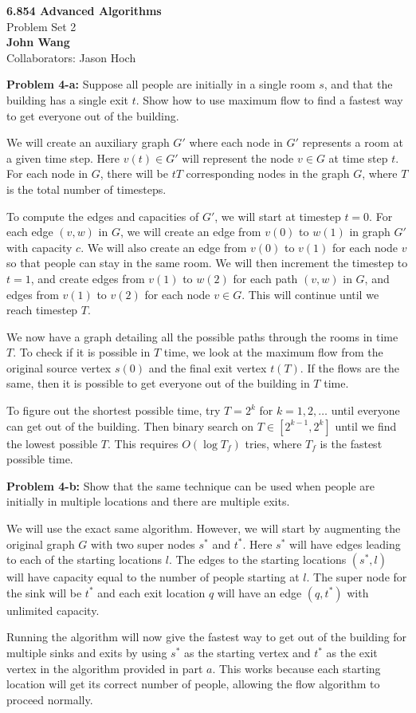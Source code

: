 \documentclass[psamsfonts]{amsart}
\newenvironment{sol}{\vspace{0.25cm}{\large \bfseries Solution:}}{\qedsymbol}
\newenvironment{prob}[1]{\begin{framed}{\large \bfseries Problem #1:}}{\end{framed}}
\newcommand{\makenewtitle}{
    \begin{center}
    {\huge \bfseries 6.854 Advanced Algorithms} \\
    Problem Set 2\\
    \vspace{0.25cm}
    {\bfseries John Wang} \\
    Collaborators: Jason Hoch
    \end{center}
    \vspace{0.5cm}
}
\begin{document}
\newpage
\makenewtitle

\begin{prob}{4-a}
Suppose all people are initially in a single room $s$, and that the building has a single exit $t$. Show how to use maximum flow to find a fastest way to get everyone out of the building.
\end{prob}
\begin{sol}
We will create an auxiliary graph $G'$ where each node in $G'$ represents a room at a given time step. Here $v(t) \in G'$ will represent the node $v \in G$ at time step $t$. For each node in $G$, there will be $tT$ corresponding nodes in the graph $G$, where $T$ is the total number of timesteps.

To compute the edges and capacities of $G'$, we will start at timestep $t=0$. For each edge $(v,w)$ in $G$, we will create an edge from $v(0)$ to $w(1)$ in graph $G'$ with capacity $c$. We will also create an edge from $v(0)$ to $v(1)$ for each node $v$ so that people can stay in the same room. We will then increment the timestep to $t=1$, and create edges from $v(1)$ to $w(2)$ for each path $(v,w)$ in $G$, and edges from $v(1)$ to $v(2)$ for each node $v \in G$. This will continue until we reach timestep $T$. 

We now have a graph detailing all the possible paths through the rooms in time $T$. To check if it is possible in $T$ time, we look at the maximum flow from the original source vertex $s(0)$ and the final exit vertex $t(T)$. If the flows are the same, then it is possible to get everyone out of the building in $T$ time. 

To figure out the shortest possible time, try $T=2^{k}$ for $k=1,2,\ldots$ until everyone can get out of the building. Then binary search on $T \in [2^{k-1}, 2^{k}]$ until we find the lowest possible $T$. This requires $O(\log T_{f})$ tries, where $T_f$ is the fastest possible time.
\end{sol}

\begin{prob}{4-b}
Show that the same technique can be used when people are initially in multiple locations and there are multiple exits.
\end{prob}
\begin{sol}
We will use the exact same algorithm. However, we will start by augmenting the original graph $G$ with two super nodes $s^*$ and $t^*$. Here $s^*$ will have edges leading to each of the starting locations $l$. The edges to the starting locations $(s^*, l)$ will have capacity equal to the number of people starting at $l$. The super node for the sink will be $t^*$ and each exit location $q$ will have an edge $(q, t^*)$ with unlimited capacity.

Running the algorithm will now give the fastest way to get out of the building for multiple sinks and exits by using $s^*$ as the starting vertex and $t^*$ as the exit vertex in the algorithm provided in part $a$. This works because each starting location will get its correct number of people, allowing the flow algorithm to proceed normally.
\end{sol}
\end{document}
